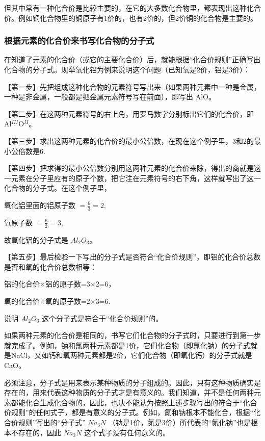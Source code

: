 但其中常有一种化合价是比较主要的，在它的大多数化合物里，都表现出这种化合价。例如铜化合物里的铜原子有1价的，也有2价的，但2价铜的化合物是主要的。

\subsubsection{根据元素的化合价来书写化合物的分子式}

在知道了元素的化合价（或它的主要化合价）后，就能根据``化合价规则''正确写出化合物的分子式。现举氧化铝为例来说明这个问题（已知氧是2价，铝是3价）：

【第一步】先把组成这种化合物的元素符号写出来（如果两种元素中一种是金属，一种是非金属，一般都是把金属元素符号写在前面），即写出
AlO。

【第二步】在这两种元素符号的右上角，用罗马数字分别标出它们的化合价，即Al\(^{III}\)O\(^{II}\)。

【第三步】求出这两种元素的化合价的最小公倍数，在现在这个例子里，3和2的最小公倍数是6.

【第四步】把求得的最小公倍数分别用这两种元素的化合价来除，得出的商就是这一元素在分子里应有的原子个数，把它注在元素符号的右下角，这样就写出了这一化合物的分子式。在这个例子里，

氧化铝里面的铝原子数 \(= \frac{6}{3} = 2,\)

氧原子数 \(= \frac{6}{2} = 3,\)

故氧化铝的分子式是 \(Al_{2}O_{3}\)。

【第五步】最后检验一下写出的分子式是否符合``化合价规则''，即铝的化合价总数是否和氧的化合价总数相等：

铝的化合价×铝的原子数=3×2=6，

氧的化合价×氧的原子数=2×3=6.

说明 \(Al_{2}O_{3}\) 这个分子式是符合于``化合价规则''的。

如果两种元素的化合价是相同的，书写它们化合物的分子式时，只要进行到第一步就完成了。例如，钠和氯两种元素都是1价，它们化合物（即氯化钠）的分子式就是NaCl，又如钙和氧两种元素都是2价，它们化合物（即氧化钙）的分子式就是CaO。

必须注意，分子式是用来表示某种物质的分子组成的。因此，只有这种物质确实是存在的，用来代表这种物质的分子式才是有意义的。我们知道，并不是任何两种元素都能化合生成化合物的，因此，也决不能认为按照上述步骤写出的符合于``化合价规则''的任何式子，都是有意义的分子式。例如，氮和钠根本不能化合，根据``化合价规则''写出的``分子式''
\(Na_{3}N\) （钠是1价，氮是3价）所代表的``氮化钠''也是根本不存在的，因此
\(Na_{3}N\) 这个式子没有任何意义的。

